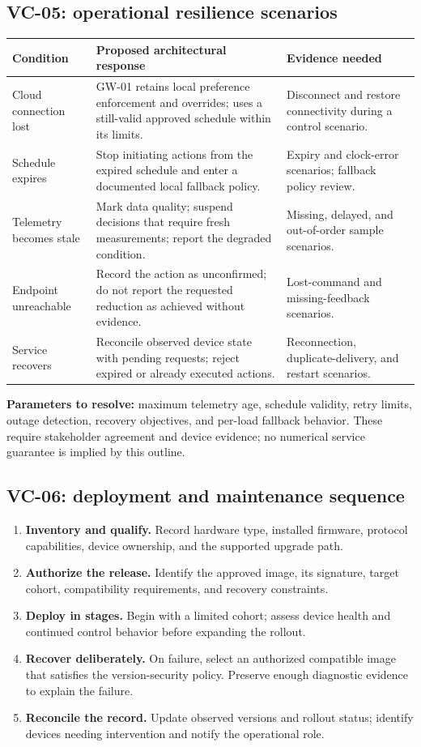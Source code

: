 \documentclass[11pt,letterpaper]{article}
\newcommand{\tablehead}[1]{\sffamily\bfseries\color{Navy}#1}
\begin{document}
\subsection{VC-05: operational resilience scenarios}
{\small
\begin{tabularx}{\linewidth}{@{}L{1.08in}Y L{1.33in}@{}}
\toprule
\tablehead{Condition} & \tablehead{Proposed architectural response} & \tablehead{Evidence needed}\\
\midrule
Cloud connection lost & GW-01 retains local preference enforcement and overrides;
uses a still-valid approved schedule within its limits. & Disconnect and restore
connectivity during a control scenario.\\
Schedule expires & Stop initiating actions from the expired schedule and enter a
documented local fallback policy. & Expiry and clock-error scenarios;
fallback policy review.\\
Telemetry becomes stale & Mark data quality; suspend decisions that require fresh
measurements; report the degraded condition. & Missing, delayed, and
out-of-order sample scenarios.\\
Endpoint unreachable & Record the action as unconfirmed; do not report the requested
reduction as achieved without evidence. & Lost-command and missing-feedback
scenarios.\\
Service recovers & Reconcile observed device state with pending requests; reject
expired or already executed actions. & Reconnection, duplicate-delivery,
and restart scenarios.\\
\bottomrule
\end{tabularx}}

\textbf{Parameters to resolve:} maximum telemetry age, schedule validity,
retry limits, outage detection, recovery objectives, and per-load fallback
behavior. These require stakeholder agreement and device evidence; no numerical
service guarantee is implied by this outline.

\subsection{VC-06: deployment and maintenance sequence}
\begin{enumerate}
\item \textbf{Inventory and qualify.} Record hardware type, installed firmware,
protocol capabilities, device ownership, and the supported upgrade path.
\item \textbf{Authorize the release.} Identify the approved image, its signature,
target cohort, compatibility requirements, and recovery constraints.
\item \textbf{Deploy in stages.} Begin with a limited cohort; assess device health
and continued control behavior before expanding the rollout.
\item \textbf{Recover deliberately.} On failure, select an authorized compatible
image that satisfies the version-security policy. Preserve enough diagnostic
evidence to explain the failure.
\item \textbf{Reconcile the record.} Update observed versions and rollout status;
identify devices needing intervention and notify the operational role.
\end{enumerate}
\end{document}
